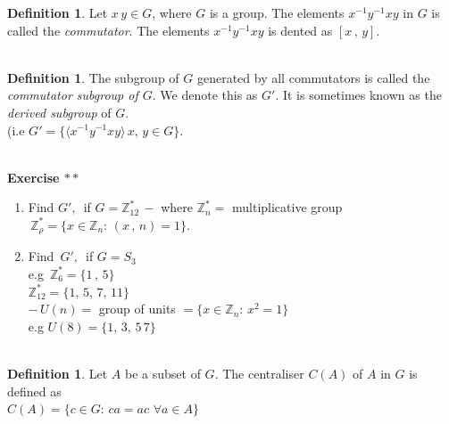 \documentclass[11pt,a4paper]{article}
\theoremstyle{definition}
\newtheorem{defn}[thm]{Definition}
\begin{document}
\begin{defn}
Let $x\, y\in G$, where $G$ is a group. The elements $x^{-1}y^{-1}xy$ in $G$ is called the \textit{commutator}. The elements $x^{-1}y^{-1}xy$ is dented as $[x\, , \, y]$.\\\\
\end{defn}





\begin{defn}
The subgroup of $G$ generated by all commutators is called the \textit{commutator subgroup of $G$}. We denote this as $G'$. It is sometimes known as the \textit{derived subgroup} of $G$.\\ (i.e $G' = \big\{\langle x^{-1}y^{-1}xy\rangle\, x,\, y\in G\big\}$.\\\\
\end{defn}


\textbf{Exercise $**$}
\begin{enumerate}
\item Find $G',\,$ if $G = \mathbb{Z}^*_{12}\, - $ where $\mathbb{Z}^*_{n} = $ multiplicative group $\, \mathbb{Z}^*_{\rho} = \{x\in \mathbb{Z}_n:\, (x\, , \, n) = 1\}$.
\item Find $\, G',\, $ if $G = S_3$\\


e.g $\, \mathbb{Z}^*_{6} = \{1\, ,\, 5\}$\\

$\mathbb{Z}^*_{12} = \{1,\, 5,\, 7,\, 11\}$\\


$-\, U(n) = $ group of units $= \{x\in \mathbb{Z}_n:\, x^2 = 1\}$\\

e.g $U(8) = \{1,\, 3, \, 5\, 7\}$\\\\
\end{enumerate}






\begin{defn}
Let $A$ be a subset of $G$. The centraliser $C(A)$ of $A$ in $G$ is defined as\\ $C(A) = \{c\in G:\, ca = ac\,\,\forall a\in A\}$\\\\
\end{defn}
\end{document}

